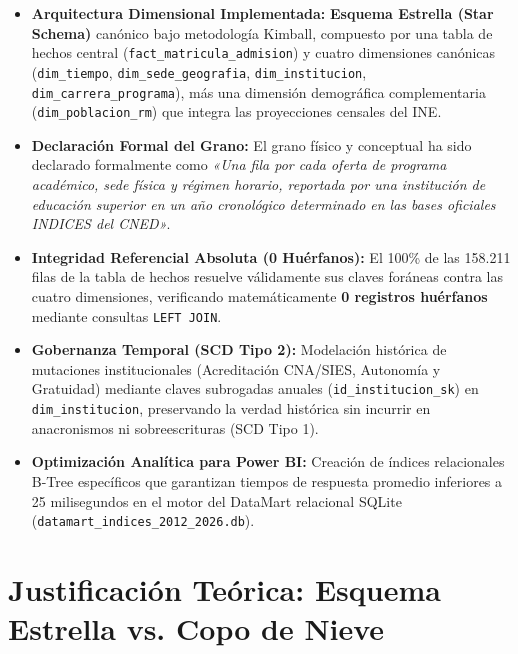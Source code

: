 \documentclass[11pt,a4paper]{article}
\begin{document}
\begin{tcolorbox}[colback=white, colframe=accentteal, title=\textbf{Cuadro de Certificación Arquitectónica del Hito 2 (Persona 3)}]
\begin{itemize}[leftmargin=*]
    \item \textbf{Arquitectura Dimensional Implementada:} \textbf{Esquema Estrella (Star Schema)} canónico bajo metodología Kimball, compuesto por una tabla de hechos central (\texttt{fact\_matricula\_admision}) y cuatro dimensiones canónicas (\texttt{dim\_tiempo}, \texttt{dim\_sede\_geografia}, \texttt{dim\_institucion}, \texttt{dim\_carrera\_programa}), más una dimensión demográfica complementaria (\texttt{dim\_poblacion\_rm}) que integra las proyecciones censales del INE.
    \item \textbf{Declaración Formal del Grano:} El grano físico y conceptual ha sido declarado formalmente como \textit{«Una fila por cada oferta de programa académico, sede física y régimen horario, reportada por una institución de educación superior en un año cronológico determinado en las bases oficiales INDICES del CNED»}.
    \item \textbf{Integridad Referencial Absoluta (0 Huérfanos):} El 100\% de las 158.211 filas de la tabla de hechos resuelve válidamente sus claves foráneas contra las cuatro dimensiones, verificando matemáticamente \textbf{0 registros huérfanos} mediante consultas \texttt{LEFT JOIN}.
    \item \textbf{Gobernanza Temporal (SCD Tipo 2):} Modelación histórica de mutaciones institucionales (Acreditación CNA/SIES, Autonomía y Gratuidad) mediante claves subrogadas anuales (\texttt{id\_institucion\_sk}) en \texttt{dim\_institucion}, preservando la verdad histórica sin incurrir en anacronismos ni sobreescrituras (SCD Tipo 1).
    \item \textbf{Optimización Analítica para Power BI:} Creación de índices relacionales B-Tree específicos que garantizan tiempos de respuesta promedio inferiores a 25 milisegundos en el motor del DataMart relacional SQLite (\texttt{datamart\_indices\_2012\_2026.db}).
\end{itemize}
\end{tcolorbox}

\section{Justificación Teórica: Esquema Estrella vs. Copo de Nieve}
\label{sec:estrella_vs_copo}
\end{document}
